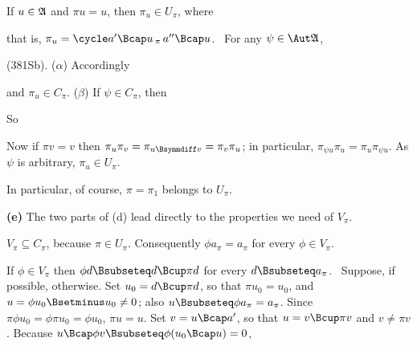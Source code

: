 {\medskip
     
 If $u\in\frak A$ and $\pi u=u$, then $\pi_u\in
U_{\pi}$, where
     
     
\noindent that is, $\pi_u=\cycleii{a'\Bcap u}{\pi}{a''\Bcap u}$.   \Prf\
For any $\psi\in\Aut\frak A$,
     
     
\noindent (381Sb).   ($\alpha$)  Accordingly
     
     
\noindent and $\pi_u\in C_{\pi}$.   ($\beta$) If $\psi\in C_{\pi}$, then
     
     
\noindent So
     
     
\noindent Now if $\pi v=v$ then $\pi_u\pi_v=\pi_{u\Bsymmdiff v}
=\pi_v\pi_u$;  in particular, $\pi_{\psi u}\pi_u=\pi_u\pi_{\psi u}$.
As
$\psi$ is arbitrary, $\pi_u\in U_{\pi}$.\ \Qed
     
In particular, of course, $\pi=\pi_1$ belongs to $U_{\pi}$.
     
\medskip
     
{\bf (e)} The two parts of (d) lead directly to the properties we need
of $V_{\pi}$.
     
\medskip
     
 $V_{\pi}\subseteq C_{\pi}$, because $\pi\in U_{\pi}$.
Consequently $\phi a_{\pi}=a_{\pi}$ for every $\phi\in V_{\pi}$.
     
\medskip
     
 If $\phi\in V_{\pi}$ then $\phi d\Bsubseteq d\Bcup\pi d$
for every $d\Bsubseteq a_{\pi}$.   \Prf\Quer\ Suppose, if possible,
otherwise.   Set $u_0=d\Bcup\pi d$, so that $\pi u_0=u_0$, and
$u=\phi u_0\Bsetminus u_0\ne 0$;  also $u\Bsubseteq\phi
a_{\pi}=a_{\pi}$.   Since $\pi\phi u_0=\phi\pi u_0=\phi u_0$, $\pi u=u$.
Set $v=u\Bcap a'$, so that $u=v\Bcup\pi v$ and $v\ne\pi v$.   Because
$u\Bcap\phi v\Bsubseteq\phi(u_0\Bcap u)=0$,
     
}
